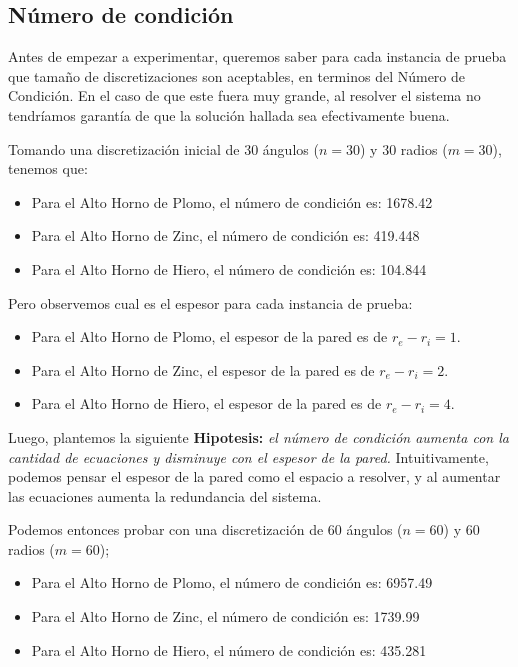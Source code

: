 \subsection{Número de condición}

Antes de empezar a experimentar, queremos saber para cada instancia de prueba que tamaño de discretizaciones son aceptables, en terminos del Número de Condición.
En el caso de que este fuera muy grande, al resolver el sistema no tendríamos garantía de que la solución hallada sea efectivamente buena.

Tomando una discretización inicial de 30 ángulos ($n = 30$) y 30 radios ($m = 30$), tenemos que:
\begin{itemize}
    \item Para el Alto Horno de Plomo, el número de condición es: 1678.42
    \item Para el Alto Horno de Zinc, el número de condición es: 419.448
    \item Para el Alto Horno de Hiero, el número de condición es: 104.844
\end{itemize}

Pero observemos cual es el espesor para cada instancia de prueba:
\begin{itemize}
    \item Para el Alto Horno de Plomo, el espesor de la pared es de $r_e - r_i = 1$.
    \item Para el Alto Horno de Zinc, el espesor de la pared es de $r_e - r_i = 2$.
    \item Para el Alto Horno de Hiero, el espesor de la pared es de $r_e - r_i = 4$.
\end{itemize}

Luego, plantemos la siguiente \textbf{Hipotesis:} \textit{el número de condición aumenta con la cantidad de ecuaciones y disminuye con el espesor de la pared.} Intuitivamente, podemos pensar el espesor de la pared como el espacio a resolver, y al aumentar las ecuaciones aumenta la redundancia del sistema.

Podemos entonces probar con una discretización de 60 ángulos ($n = 60$) y 60 radios ($m = 60$);
\begin{itemize}
    \item Para el Alto Horno de Plomo, el número de condición es: 6957.49
    \item Para el Alto Horno de Zinc, el número de condición es: 1739.99
    \item Para el Alto Horno de Hiero, el número de condición es: 435.281
\end{itemize}

